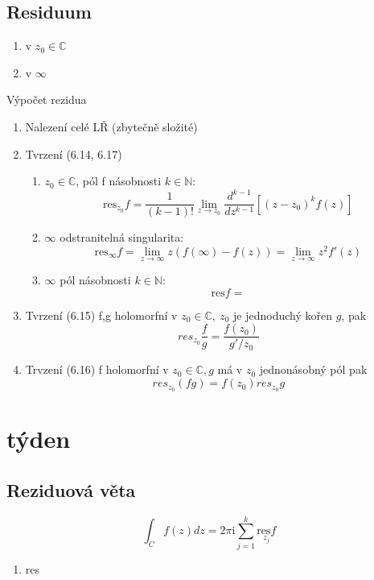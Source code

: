 \documentclass{article}
\newcommand{\mi}{\mathrm{i}}
\newcommand{\res}{\mathrm{res}}
\begin{document}
        \subsection{Residuum}

        \begin{enumerate}[label=\alph*.]
            \item v $ z_0\in\mathbb{C}$
            \item v $ \infty$
        \end{enumerate}
        Výpočet rezidua
        \begin{enumerate}
            \item Nalezení celé LŘ (zbytečně složité)
            \item Tvrzení (6.14, 6.17)
            \begin{enumerate}[label=\alph*.]
                \item $z_0\in\mathbb{C}$, pól f násobnosti $k\in\mathbb{N}$:
                    \[\res_{z_0}f=\frac{1}{(k-1)!}\lim_{z\to z_0}\frac{d^{k-1}}{dz^{k-1}}
                    \left[(z-z_0)^kf(z)\right]\]
                \item $\infty$ odstranitelná singularita:
                    \[\res_{\infty}f=\lim_{z\to\infty}z(f(\infty)-f(z))=\lim_{z\to\infty}z^2f'(z)\]
                \item $\infty$ pól násobnosti $k\in\mathbb{N}$:
                    \[\res f =\]
            \end{enumerate}
            \item Tvrzení (6.15)
                f,g holomorfní v $z_0\in\mathbb{C},\:z_0$ je jednoduchý kořen $g$, pak
                \[res_{z_0}\frac{f}{g}=\frac{f(z_0)}{g'/z_0}\]
            \item Trvzení (6.16)
                f holomorfní v $z_0\in\mathbb{C}, g$ má v $z_0 $ jednonásobný pól pak
                \[res_{z_0}(fg)=f(z_0)res_{z_0}g\]
    \end{enumerate}
    \section{týden}%
    \subsection{Reziduová věta}
        \[\int_Cf(z)dz=2\pi\mi\sum_{j=1}^{k}\underset{z_j}{\res f}\]
        \begin{enumerate}
            \item res
        \end{enumerate}
\end{document}
